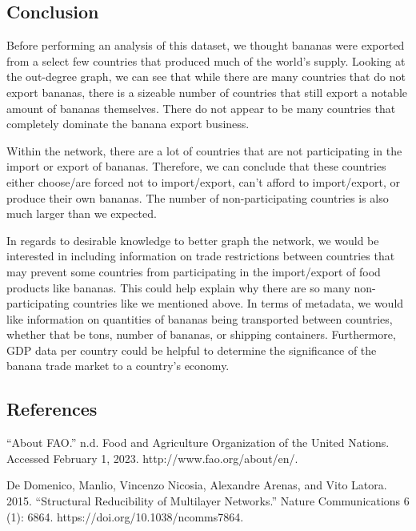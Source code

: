 \documentclass[11pt]{article}
\begin{document}
    \hypertarget{conclusion}{%
\subsection{Conclusion}\label{conclusion}}

    Before performing an analysis of this dataset, we thought bananas were
exported from a select few countries that produced much of the world's
supply. Looking at the out-degree graph, we can see that while there are
many countries that do not export bananas, there is a sizeable number of
countries that still export a notable amount of bananas themselves.
There do not appear to be many countries that completely dominate the
banana export business.

Within the network, there are a lot of countries that are not
participating in the import or export of bananas. Therefore, we can
conclude that these countries either choose/are forced not to
import/export, can't afford to import/export, or produce their own
bananas. The number of non-participating countries is also much larger
than we expected.

In regards to desirable knowledge to better graph the network, we would
be interested in including information on trade restrictions between
countries that may prevent some countries from participating in the
import/export of food products like bananas. This could help explain why
there are so many non-participating countries like we mentioned above.
In terms of metadata, we would like information on quantities of bananas
being transported between countries, whether that be tons, number of
bananas, or shipping containers. Furthermore, GDP data per country could
be helpful to determine the significance of the banana trade market to a
country's economy.

    \hypertarget{references}{%
\subsection{References}\label{references}}

    ``About FAO.'' n.d. Food and Agriculture Organization of the United
Nations. Accessed February 1, 2023. http://www.fao.org/about/en/.

De Domenico, Manlio, Vincenzo Nicosia, Alexandre Arenas, and Vito
Latora. 2015. ``Structural Reducibility of Multilayer Networks.'' Nature
Communications 6 (1): 6864. https://doi.org/10.1038/ncomms7864.


    
    
    
\end{document}
